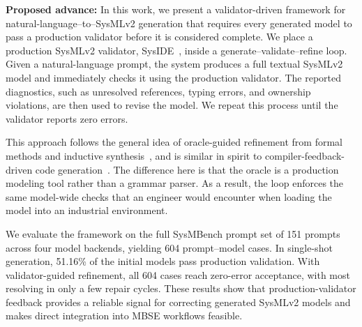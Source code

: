 \documentclass[colorlinks,upint,subscriptcorrection,varvw,hyphenate,balance]{asmeconf} %
\begin{document}
\textbf{Proposed advance:}
In this work, we present a validator-driven framework for natural-language--to--SysMLv2 generation that requires every generated model to pass a production validator before it is considered complete. We place a production SysMLv2 validator, SysIDE~\cite{sensmetry2024syside}, inside a generate--validate--refine loop. Given a natural-language prompt, the system produces a full textual SysMLv2 model and immediately checks it using the production validator. The reported diagnostics, such as unresolved references, typing errors, and ownership violations, are then used to revise the model. We repeat this process until the validator reports zero errors.

This approach follows the general idea of oracle-guided refinement from formal methods and inductive synthesis~\cite{clarke2000cegar,solarlezama2008thesis,jha2010ogis,alur2013sygus}, and is similar in spirit to compiler-feedback-driven code generation~\cite{wang2022compilable,grubisic2024compiler}. The difference here is that the oracle is a production modeling tool rather than a grammar parser. As a result, the loop enforces the same model-wide checks that an engineer would encounter when loading the model into an industrial environment.

We evaluate the framework on the full SysMBench prompt set of 151 prompts across four model backends, yielding 604 prompt--model cases. In single-shot generation, 51.16\% of the initial models pass production validation. With validator-guided refinement, all 604 cases reach zero-error acceptance, with most resolving in only a few repair cycles. These results show that production-validator feedback provides a reliable signal for correcting generated SysMLv2 models and makes direct integration into MBSE workflows feasible.

\end{document}
